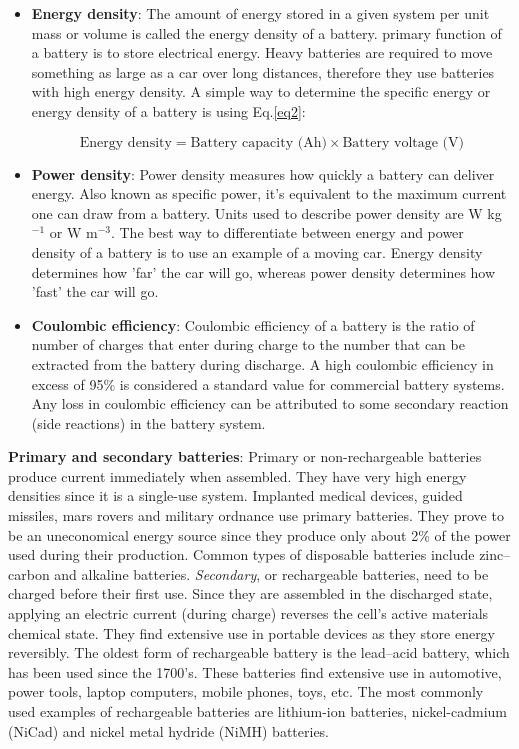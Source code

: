 \begin{itemize}
\item \textbf{Energy density}: The amount of energy stored in a given system per unit mass or volume is called the energy density of a battery. primary function of a battery is to store electrical energy. Heavy batteries are required to move something as large as a car over long distances, therefore they use batteries with high energy density. A simple way to determine the specific energy or energy density of a battery is using Eq.\ref{eq2}:

\begin{equation} \label{eq2}
    \text{Energy density}= \text{Battery capacity (Ah)} \times \text{Battery voltage (V)}
\end{equation}

\item \textbf{Power density}: Power density measures how quickly a battery can deliver energy. Also known as specific power, it's equivalent to the maximum current one can draw from a battery. Units used to describe power density are W kg$^{-1}$ or W m$^{-3}$. The best way to differentiate between energy and power density of a battery is to use an example of a moving car. Energy density determines how 'far' the car will go, whereas power density determines how 'fast' the car will go.

\item \textbf{Coulombic efficiency}: Coulombic efficiency of a battery is the ratio of number of charges that enter during charge to the number that can be extracted from the battery during discharge.  A high coulombic efficiency in excess of 95\% is considered a standard value for commercial battery systems. Any loss in coulombic efficiency can be attributed to some secondary reaction (side reactions) in the battery system. 
\end{itemize}

\textbf{Primary and secondary batteries}: Primary or non-rechargeable batteries produce current immediately when assembled. They have very high energy densities since it is a single-use system. Implanted medical devices, guided missiles, mars rovers and military ordnance use primary batteries. They prove to be an uneconomical energy source since they produce only about 2\% of the power used during their production. Common types of disposable batteries include zinc–carbon and alkaline batteries. 
\textit{Secondary}, or rechargeable batteries, need to be charged before their first use. Since they are  assembled in the discharged state, applying an electric current (during charge) reverses the cell's active materials chemical state. They find extensive use in portable devices as they store energy reversibly. The oldest form of rechargeable battery is the lead–acid battery, which has been used since the 1700's. These batteries find extensive use in automotive, power tools, laptop computers, mobile phones, toys, etc. The most commonly used examples of rechargeable batteries are lithium-ion batteries, nickel-cadmium (NiCad) and nickel metal hydride (NiMH) batteries. 

